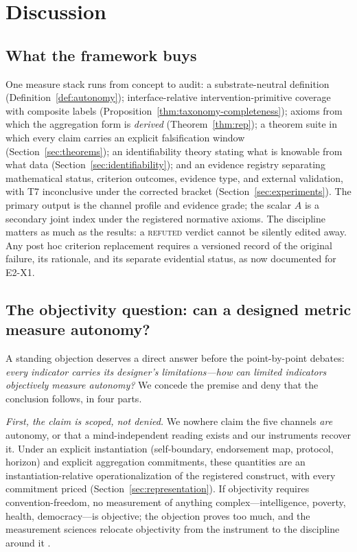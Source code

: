 \section{Discussion}\label{sec:discussion}

\subsection{What the framework buys}

One measure stack runs from concept to audit: a substrate-neutral definition
(Definition~\ref{def:autonomy}); interface-relative intervention-primitive
coverage with composite labels (Proposition~\ref{thm:taxonomy-completeness});
axioms from which the
aggregation form is \emph{derived} (Theorem~\ref{thm:rep}); a theorem suite
in which every claim carries an explicit falsification window
(Section~\ref{sec:theorems}); an identifiability theory stating what is
knowable from what data (Section~\ref{sec:identifiability}); and an evidence
registry separating mathematical status, criterion outcomes, evidence type,
and external validation, with T7 inconclusive under the corrected bracket
(Section~\ref{sec:experiments}).
The primary output is the channel profile and evidence grade; the scalar
$A$ is a secondary joint index under the registered normative axioms. The
discipline matters as much as the results: a \textsc{refuted} verdict cannot
be silently edited away. Any post hoc criterion replacement requires a
versioned record of the original failure, its rationale, and its separate
evidential status, as now documented for E2-X1.

\subsection{The objectivity question: can a designed metric measure
autonomy?}\label{sec:objectivity}

A standing objection deserves a direct answer before the point-by-point
debates: \emph{every indicator carries its designer's limitations---how can
limited indicators objectively measure autonomy?} We concede the premise and
deny that the conclusion follows, in four parts.

\emph{First, the claim is scoped, not denied.} We nowhere claim the five
channels \emph{are} autonomy, or that a mind-independent reading exists and
our instruments recover it. Under an explicit instantiation (self-boundary,
endorsement map, protocol, horizon) and explicit aggregation commitments,
these quantities are an instantiation-relative operationalization of the
registered construct, with every commitment priced
(Section~\ref{sec:representation}). If objectivity requires convention-freedom,
no measurement of anything complex---intelligence, poverty, health,
democracy---is objective; the objection proves too much, and the measurement
sciences relocate objectivity from the instrument to the discipline around it
\citep{krantz1971,oecd2008}.

